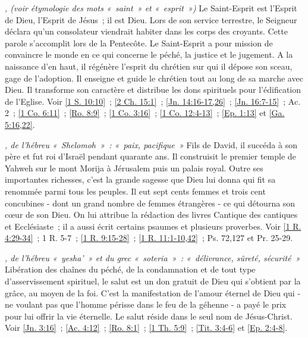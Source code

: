 \begin{multicols}{2}
\textit{, (voir étymologie des mots «~saint~» et «~esprit~»)}\newline
Le Saint-Esprit est l'Esprit de Dieu, l'Esprit de Jésus~; il est Dieu. Lors de son service terrestre, le Seigneur déclara qu'un consolateur viendrait habiter dans les corps des croyants. Cette parole s'accomplit lors de la Pentecôte. Le Saint-Esprit a pour mission de convaincre le monde en ce qui concerne le péché, la justice et le jugement. A la naissance d'en haut, il régénère l'esprit du chrétien sur qui il dépose son sceau, gage de l'adoption. Il enseigne et guide le chrétien tout au long de sa marche avec Dieu. Il transforme son caractère et distribue les dons spirituels pour l'édification de l'Eglise.\newline
Voir \vref{1 S. 10:10}~; \vref{2 Ch. 15:1}~; \vref{Jn. 14:16-17,26}~; \vref{Jn. 16:7-15}~; Ac. 2~; \vref{1 Co. 6:11}~; \vref{Ro. 8:9}~; \vref{1 Co. 3:16}~; \vref{1 Co. 12:4-13}~; \vref{Ep. 1:13} et \vref{Ga. 5:16,22}.

\textit{, de l'hébreu «~Shelomoh~»~: «~paix, pacifique~»}\newline
Fils de David, il succéda à son père et fut roi d'Israël pendant quarante ans. Il construisit le premier temple de Yahweh sur le mont Morija à Jérusalem puis un palais royal. Outre ses importantes richesses, c'est la grande sagesse que Dieu lui donna qui fit sa renommée parmi tous les peuples. Il eut sept cents femmes et trois cent concubines - dont un grand nombre de femmes étrangères - ce qui détourna son cœur de son Dieu. On lui attribue la rédaction des livres Cantique des cantiques et Ecclésiaste~; il a aussi écrit certains psaumes et plusieurs proverbes.\newline
Voir \vref{1 R. 4:29-34}~; 1 R. 5-7~; \vref{1 R. 9:15-28}~; \vref{1 R. 11:1-10,42}~; Ps. 72,127 et Pr. 25-29.

\textit{, de l'hébreu «~yesha'~» et du grec «~soteria~»~: «~délivrance, sûreté, sécurité~»}\newline
Libération des chaînes du péché, de la condamnation et de tout type d'asservissement spirituel, le salut est un don gratuit de Dieu qui s'obtient par la grâce, au moyen de la foi. C'est la manifestation de l'amour éternel de Dieu qui - ne voulant pas que l'homme périsse dans le feu de la géhenne - a payé le prix pour lui offrir la vie éternelle. Le salut réside dans le seul nom de Jésus-Christ.\newline
Voir \vref{Jn. 3:16}~; \vref{Ac. 4:12}~; \vref{Ro. 8:1}~; \vref{1 Th. 5:9}~; \vref{Tit. 3:4-6} et \vref{Ep. 2:4-8}.


\end{multicols}
